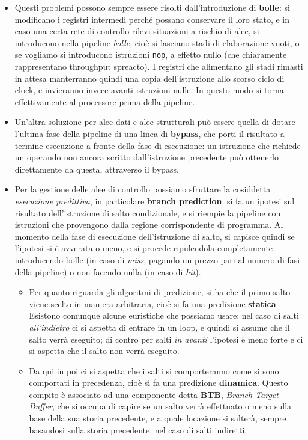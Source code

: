 \documentclass[a4paper,11pt]{article}
\begin{document}
\begin{itemize}
	\item 
		Questi problemi possono sempre essere risolti dall'introduzione di \textbf{bolle}: si modificano i registri intermedi perché possano conservare il loro stato, e in caso una certa rete di controllo rilevi situazioni a rischio di alee, si introducono nella pipeline \textit{bolle}, cioè si lasciano stadi di elaborazione vuoti, o se vogliamo si introducono istruzioni \lstinline|nop|, a effetto nullo (che chiaramente rappresentano throughput spreacto).
		I registri che alimentano gli stadi rimasti in attesa manterranno quindi una copia dell'istruzione allo scorso ciclo di clock, e invieranno invece avanti istruzioni nulle.
		In questo modo si torna effettivamente al processore prima della pipeline.
	\item 
		Un'altra soluzione per alee dati e alee strutturali può essere quella di dotare l'ultima fase della pipeline di una linea di \textbf{bypass}, che porti il risultato a termine esecuzione a fronte della fase di esecuzione: un istruzione che richiede un operando non ancora scritto dall'istruzione precedente può ottenerlo direttamente da questa, attraverso il bypass.

	\item 
		Per la gestione delle alee di controllo possiamo sfruttare la cosiddetta \textit{esecuzione predittiva}, in particolare \textbf{branch prediction}: si fa un ipotesi sul risultato dell'istruzione di salto condizionale, e si riempie la pipeline con istruzioni che provengono dalla regione corrispondente di programma.
		Al momento della fase di esecuzione dell'istruzione di salto, si capisce quindi se l'ipotesi si è avverata o meno, e si procede ripulendola completamente introducendo bolle (in caso di \textit{miss}, pagando un prezzo pari al numero di fasi della pipeline) o non facendo nulla (in caso di \textit{hit}).

		\begin{itemize}
			\item 
				Per quanto riguarda gli algoritmi di predizione, si ha che il primo salto viene scelto in maniera arbitraria, cioè si fa una predizione \textbf{statica}.
				Esistono comunque alcune euristiche che possiamo usare: nel caso di salti \textit{all'indietro} ci si aspetta di entrare in un loop, e quindi si assume che il salto verrà eseguito; di contro per salti \textit{in avanti} l'ipotesi è meno forte e ci si aspetta che il salto non verrà eseguito. 
			\item 
				Da qui in poi ci si aspetta che i salti si comporteranno come si sono comportati in precedenza, cioè si fa una predizione \textbf{dinamica}.
				Questo compito è associato ad una componente detta \textbf{BTB}, \textit{Branch Target Buffer}, che si occupa di capire se un salto verrà effettuato o meno sulla base della sua storia precedente, e a quale locazione si salterà, sempre basandosi sulla storia precedente, nel caso di salti indiretti.


\end{itemize}
\end{itemize}
\end{document}
